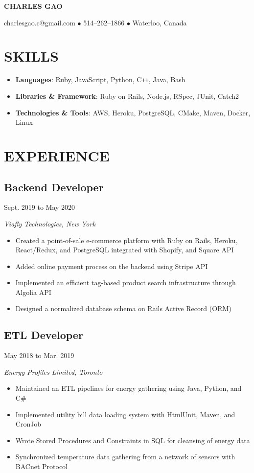 \documentclass[11pt]{extarticle}
\begin{document}
\begin{center}
\textbf{\huge{CHARLES GAO}}

charlesgao.c@gmail.com $\bullet$ 514--262--1866 $\bullet$ Waterloo, Canada
\end{center}

\section*{SKILLS}
\begin{itemize}
  \item \textbf{Languages}: Ruby, JavaScript, Python, C\texttt{++}, Java, Bash
  \item \textbf{Libraries \& Framework}: Ruby on Rails, Node.js, RSpec, JUnit, Catch2
  \item \textbf{Technologies \& Tools}: AWS, Heroku, PostgreSQL, CMake, Maven, Docker, Linux
\end{itemize}

\section*{EXPERIENCE}
\subsection*{Backend Developer} \hfill Sept. 2019 to May 2020

\textit{Viafly Technologies, New York}
\begin{itemize}
  \item Created a point-of-sale e-commerce platform with Ruby on Rails, Heroku, React/Redux, and PostgreSQL integrated with Shopify, and Square API
  \item Added online payment process on the backend using Stripe API
  \item Implemented an efficient tag-based product search infrastructure through Algolia API
  \item Designed a normalized database schema on Rails Active Record (ORM)
\end{itemize}

\subsection*{ETL Developer} \hfill May 2018 to Mar. 2019

\textit{Energy Profiles Limited, Toronto}
\begin{itemize}
  \item Maintained an ETL pipelines for energy gathering using Java, Python, and C\#
  \item Implemented utility bill data loading system with HtmlUnit, Maven, and CronJob
  \item Wrote Stored Procedures and Constraints in SQL for cleansing of energy data
  \item Synchronized temperature data gathering from a network of sensors with BACnet Protocol
\end{itemize}
\end{document}
